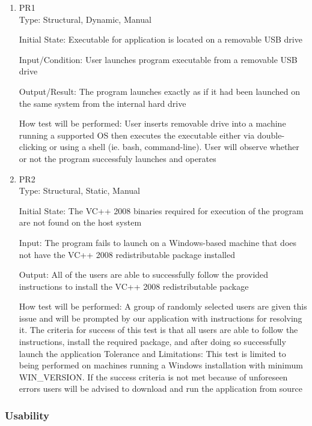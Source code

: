 \documentclass[12pt, titlepage]{article}
\begin{document}
	\begin{enumerate}
		\item{PR1\\}
		Type: Structural, Dynamic, Manual
		
		Initial State: Executable for application is located on a removable USB drive
		
		Input/Condition: User launches program executable from a removable USB drive
		
		Output/Result: The program launches exactly as if it had been launched on
		the same system from the internal hard drive
		
		How test will be performed: User inserts removable drive into a machine running a
		supported OS then executes the executable either via double-clicking or using
		a shell (ie. bash, command-line). User will observe whether or not the program
		successfuly launches and operates

		\item{PR2\\}
		Type: Structural, Static, Manual
		
		Initial State: The VC++ 2008 binaries required for execution of the program
		are not found on the host system
		
		Input: The program fails to launch on a Windows-based machine that does not
		have the VC++ 2008 redistributable package installed
		
		Output: All of the users are able to successfully follow the provided
		instructions to install the VC++ 2008 redistributable package

		How test will be performed: A group of randomly selected users are given 
		this issue and will be prompted by our application with instructions for
		resolving it. The criteria for success of this test is that all users are able
		to follow the instructions, install the required package, and after doing
		so successfully launch the application \newline
		Tolerance and Limitations: This test is limited to being performed on
		machines running a Windows installation with minimum WIN\_VERSION.
		If the success criteria is not met because of unforeseen errors users will
		be advised to download and run the application from source
	\end{enumerate}

	\subsubsection{Usability}
\end{document}
